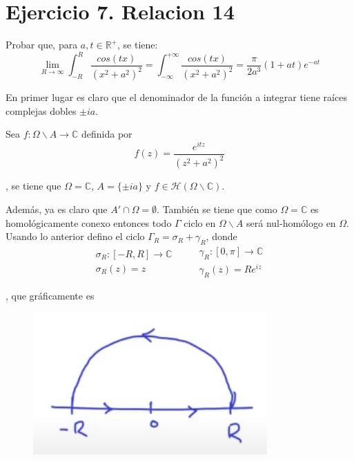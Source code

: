 \documentclass{article}
\begin{document}
\section{Ejercicio 7. Relacion 14}
Probar que, para $a,t\in\mathbb{R}^+$, se tiene:
\begin{equation*}
\lim_{R\to\infty}\int_{-R}^{R}\frac{cos(tx)}{(x^2+a^2)^2}=\int_{-\infty}^{+\infty}\frac{cos(tx)}{(x^2+a^2)^2}=\frac{\pi}{2a^3}(1+at)e^{-at}
\end{equation*}

En primer lugar es claro que el denominador de la función a integrar tiene raíces complejas dobles $\pm ia$. 

Sea $f:\Omega\backslash A\longrightarrow \mathbb{C}$ definida por
\begin{equation*}
f(z)=\frac{e^{itz}}{(z^2+a^2)^2}
\end{equation*}

, se tiene que $\Omega=\mathbb{C}$, $A=\{\pm ia\}$ y $f\in \mathcal{H}(\Omega\backslash \mathbb{C})$.

Además, ya es claro que $A'\cap \Omega=\emptyset$. También se tiene que como $\Omega =\mathbb{C}$ es homológicamente conexo entonces todo $\Gamma$ ciclo en $\Omega\backslash A$ será nul-homólogo en $\Omega$. Usando lo anterior defino el ciclo $\Gamma_R=\sigma_R+\gamma_R$, donde
\begin{equation*}
\left.\begin{array}{c}
\sigma_R:[-R,R]\longrightarrow\mathbb{C}\\
\sigma_R(z)=z
\end{array}\right.\qquad \left.\begin{array}{c}
\gamma_R:[0,\pi]\longrightarrow \mathbb{C}\\
\gamma_R(z)=Re^{iz}
\end{array}\right.
\end{equation*}

, que gráficamente es
\begin{figure}[h]
\centering
\includegraphics[scale=1,width=0.8\textwidth]{ciclo_ejer_4.png}
\end{figure}
\end{document}
